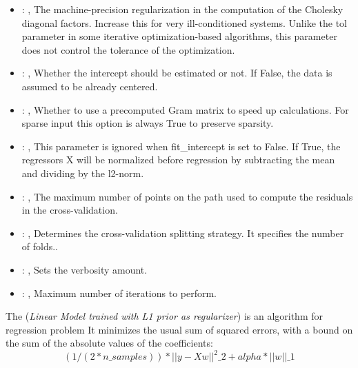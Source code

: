 \begin{itemize}
    \item {}: , 
      The machine-precision regularization in the computation of the Cholesky
      diagonal factors. Increase this for very ill-conditioned systems. Unlike the tol
      parameter in some iterative optimization-based algorithms, this parameter does not
      control the tolerance of the optimization.

    \item {}: , 
      Whether the intercept should be estimated or not. If False,
      the data is assumed to be already centered.

    \item {}: , 
      Whether to use a precomputed Gram matrix to speed up calculations.
      For sparse input this option is always True to preserve sparsity.

    \item {}: , 
      This parameter is ignored when fit\_intercept is set to False. If True,
      the regressors X will be normalized before regression by subtracting the mean and
      dividing by the l2-norm.

    \item {}: , 
      The maximum number of points on the path used to compute the
      residuals in the cross-validation.

    \item {}: , 
      Determines the cross-validation splitting strategy.
      It specifies the number of folds..

    \item {}: , 
      Sets the verbosity amount.

    \item {}: , 
      Maximum number of iterations to perform.
  \end{itemize}
 The  (\textit{Linear Model trained with L1 prior as regularizer})
 is an algorithm for regression problem                         It minimizes the usual sum of
 squared errors, with a bound on the sum of the                         absolute values of the
 coefficients:                         \begin{equation}                          (1 / (2 *
 n\_samples)) * ||y - Xw||^2\_2 + alpha * ||w||\_1                         \end{equation}


